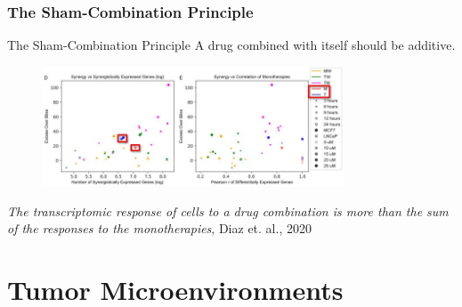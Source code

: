 \documentclass{beamer}
\begin{document}
\begin{frame}
  \frametitle{The Sham-Combination Principle}
  \begin{block}{The Sham-Combination Principle} 
    A drug combined with itself should be additive.
  \end{block}
  \begin{figure}[!htb]
    \includegraphics[width=0.8\textwidth]{figs/transcriptomic-synergy-sham_failure.jpg}
  \end{figure}
  \small{\textit{The transcriptomic response of cells to a drug combination is more than the sum of the responses to the monotherapies}, Diaz et. al., 2020}~\cite{Diaz2020-bi}
\end{frame}

\section{Tumor Microenvironments}
\end{document}
